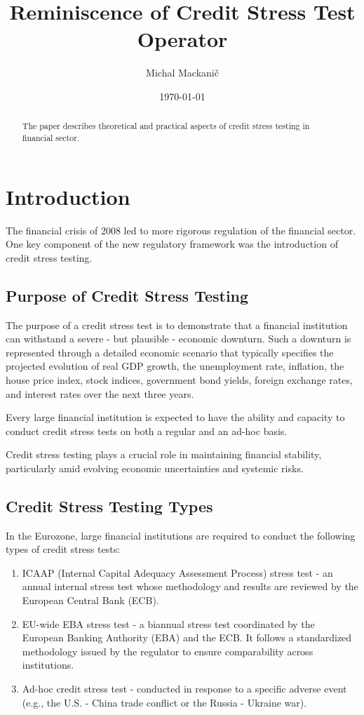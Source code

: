 \documentclass[11pt,a4paper]{article}
\title{Reminiscence of Credit Stress Test Operator}
\author{Michal Mackanič}
\date{\today}
\begin{document}
\maketitle

\begin{abstract}
The paper describes theoretical and practical aspects of credit stress testing in financial sector.
\end{abstract}

\section{Introduction}

The financial crisis of 2008 led to more rigorous regulation of the financial sector. One key component of the new regulatory framework was the introduction of credit stress testing.

\subsection{Purpose of Credit Stress Testing}
The purpose of a credit stress test is to demonstrate that a financial institution can withstand a severe - but plausible - economic downturn. Such a downturn is represented through a detailed economic scenario that typically specifies the projected evolution of real GDP growth, the unemployment rate, inflation, the house price index, stock indices, government bond yields, foreign exchange rates, and interest rates over the next three years.

Every large financial institution is expected to have the ability and capacity to conduct credit stress tests on both a regular and an ad-hoc basis.

Credit stress testing plays a crucial role in maintaining financial stability, particularly amid evolving economic uncertainties and systemic risks.

\subsection{Credit Stress Testing Types}
In the Eurozone, large financial institutions are required to conduct the following types of credit stress tests:
\begin{enumerate}
\item ICAAP (Internal Capital Adequacy Assessment Process) stress test - an annual internal stress test whose methodology and results are reviewed by the European Central Bank (ECB).
\item EU-wide EBA stress test - a biannual stress test coordinated by the European Banking Authority (EBA) and the ECB. It follows a standardized methodology issued by the regulator to ensure comparability across institutions.
\item Ad-hoc credit stress test - conducted in response to a specific adverse event (e.g., the U.S. - China trade conflict or the Russia - Ukraine war).
\end{enumerate}
\end{document}
